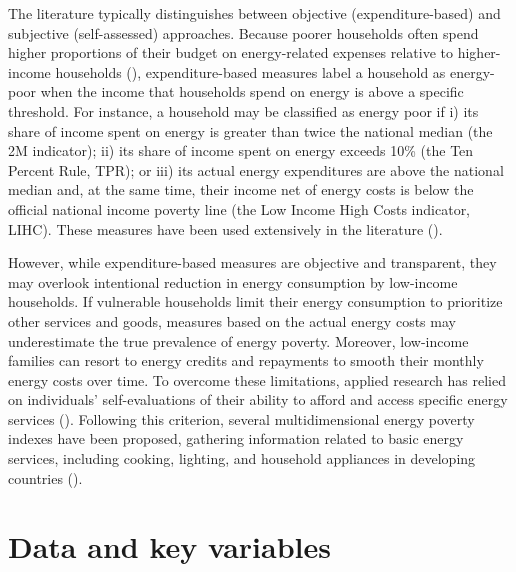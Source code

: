 \documentclass[preprint,authoryear,12pt]{elsarticle}
\newcommand{\citeTwo}[1]{(\cite{#1})}
\begin{document}
The literature typically distinguishes between objective (expenditure-based) and subjective (self-assessed) approaches. Because poorer households often spend higher proportions of their budget on energy-related expenses relative to higher-income households \citeTwo{SM22}, expenditure-based measures label a household as energy-poor when the income that households spend on energy is above a specific threshold. For instance, a household may be classified as energy poor if i) its share of income spent on energy is greater than twice the national median (the 2M indicator); ii) its share of income spent on energy exceeds 10\% (the Ten Percent Rule, TPR); or iii) its actual energy expenditures are above the national median and, at the same time, their income net of energy costs is below the official national income poverty line (the Low Income High Costs indicator, LIHC). These measures have been used extensively in the literature \citeTwo{FFT22,ABR22,MM24}.

However, while expenditure-based measures are objective and transparent, they may overlook intentional reduction in energy consumption by low-income households. If vulnerable households limit their energy consumption to prioritize other services and goods, measures based on the actual energy costs may underestimate the true prevalence of energy poverty. Moreover, low-income families can resort to energy credits and repayments to smooth their monthly energy costs over time. To overcome these limitations, applied research has relied on individuals' self-evaluations of their ability to afford and access specific energy services \citeTwo{PAS22,SRL23}. Following this criterion, several multidimensional energy poverty indexes have been proposed, gathering information related to basic energy services, including cooking, lighting, and household appliances in developing countries \citeTwo{ALXBR20,GJA24}.

\section{Data and key variables} \label{Data_and_key_variables}
\end{document}
